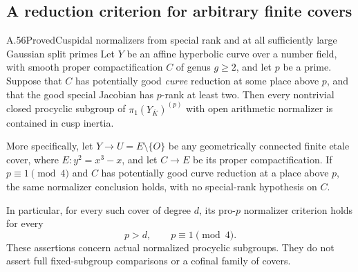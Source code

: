 \subsection{A reduction criterion for arbitrary finite covers}

\begin{statement}{A.56}{Proved}{Cuspidal normalizers from special rank and at all sufficiently large Gaussian split primes}
Let \(Y\) be an affine hyperbolic curve over a number field,
with smooth proper compactification \(C\) of genus \(g\ge2\),
and let \(p\) be a prime. Suppose that \(C\) has potentially
good \emph{curve} reduction at some place above \(p\), and that
the good special Jacobian has \(p\)-rank at least two.
Then every nontrivial closed procyclic subgroup of
\(\pi_1(Y_{\overline K})^{(p)}\) with open arithmetic normalizer
is contained in cusp inertia.

More specifically, let \(Y\to U=E\setminus\{O\}\) be any
geometrically connected finite etale cover, where
\(E:y^2=x^3-x\), and let \(C\to E\) be its proper
compactification. If \(p\equiv1\pmod4\) and \(C\) has
potentially good curve reduction at a place above \(p\),
the same normalizer conclusion holds, with no special-rank
hypothesis on \(C\).

In particular, for every such cover of degree \(d\), its
pro-\(p\) normalizer criterion holds for every
\[
                         p>d,\qquad p\equiv1\pmod4.
                                                        \tag{A.56.1}
\]
These assertions concern actual normalized procyclic subgroups.
They do not assert full fixed-subgroup comparisons or a
cofinal family of covers.
\end{statement}
